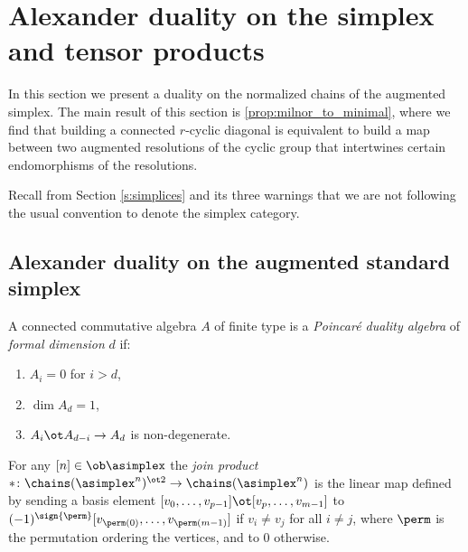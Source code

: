 
\section{Alexander duality on the simplex and tensor products}\label{s:3complexes}

In this section we present a duality on the normalized chains of the augmented simplex. The main result of this section is \cref{prop:milnor_to_minimal}, where we find that building a connected $r$-cyclic diagonal is equivalent to build a map between two augmented resolutions of the cyclic group that intertwines certain endomorphisms of the resolutions. 

\begin{warning}
	Recall from Section \cref{s:simplices} and its three warnings that we are not following the usual convention to denote the simplex category.
\end{warning}
\subsection{Alexander duality on the augmented standard simplex}\label{s:alexander}


\begin{definition}\label{d:poincare_duality_algebra}
	A connected commutative algebra $A$ of finite type is a \emph{Poincar\'e duality algebra} of \emph{formal dimension} $d$ if:
	\begin{enumerate}
		\item\label{i:pd1} $A_i = 0$ for $i > d$,
		\item\label{i:pd2} $\dim A_d = 1$,
		\item\label{i:pd3} $A_i \ot A_{d-i} \to A_d$ is non-degenerate.
	\end{enumerate}
\end{definition}

\begin{definition}\label{def:join_product}
	For any $[n] \in \ob\asimplex$ the \textit{join product} $\ast \colon \chains(\asimplex^{n})^{\ot 2} \to \chains(\asimplex^{n})$ is the linear map defined by sending a basis element $[v_0, \dots, v_{p-1}] \ot [v_{p},\dots,v_{m-1}]$ to $(-1)^{\sign{\perm}}[v_{\perm(0)}, \dots, v_{\perm(m-1)}]$	if $v_i \neq v_j$ for all $i \neq j$, where $\perm$ is the permutation ordering the vertices, and to $0$ otherwise. 
\end{definition}

